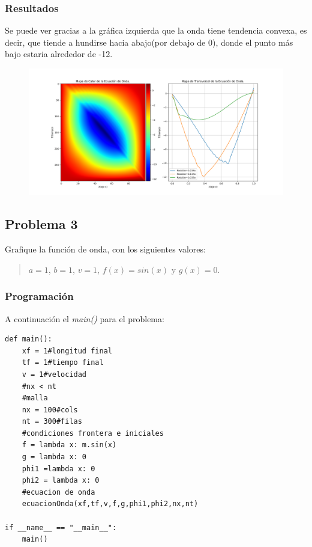 \documentclass[a4paper,12pt]{article}
\newcommand{\eq}[1]{$#1$}
\begin{document}
    \subsubsection{Resultados}
    Se puede ver gracias a la gráfica izquierda que la onda tiene tendencia convexa, es decir, que
    tiende a hundirse hacia abajo(por debajo de 0), donde el punto más bajo estaria alrededor de -12.

    \begin{figure}[h]
        \centering
        \includegraphics[width=\textwidth]{graph2.png}
    \end{figure}

    \subsection{Problema 3}
    Grafique la función de onda, con los siguientes valores:
    \begin{quote}
        \centering
        \eq{a = 1}, \eq{b = 1}, \eq{v = 1}, \eq{f(x) = sin(x)} y \eq{g(x) = 0}.
    \end{quote}
    \subsubsection{Programación}
    A continuación el \emph{main()} para el problema:

\begin{lstlisting}[frame=single]
def main():
    xf = 1#longitud final
    tf = 1#tiempo final
    v = 1#velocidad 
    #nx < nt
    #malla
    nx = 100#cols
    nt = 300#filas
    #condiciones frontera e iniciales
    f = lambda x: m.sin(x)
    g = lambda x: 0
    phi1 =lambda x: 0
    phi2 = lambda x: 0
    #ecuacion de onda
    ecuacionOnda(xf,tf,v,f,g,phi1,phi2,nx,nt)

if __name__ == "__main__":
    main()
\end{lstlisting}
\end{document}

